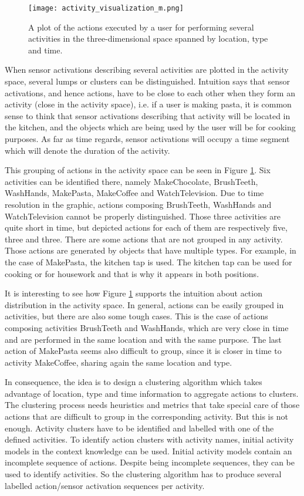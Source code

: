 \begin{figure}[htbp]
\centering
\texttt{[image: activity\_visualization\_m.png]}
    \caption{A plot of the actions executed by a user for performing several activities in the three-dimensional space spanned by location, type and time.}
    \label{fig-action-plot}
\end{figure}

When sensor activations describing several activities are plotted in the activity space, several lumps or clusters can be distinguished. Intuition says that sensor activations, and hence actions, have to be close to each other when they form an activity (close in the activity space), i.e. if a user is making pasta, it is common sense to think that sensor activations describing that activity will be located in the kitchen, and the objects which are being used by the user will be for cooking purposes. As far as time regards, sensor activations will occupy a time segment which will denote the duration of the activity.

This grouping of actions in the activity space can be seen in Figure \ref{fig-action-plot}. Six activities can be identified there, namely MakeChocolate, BrushTeeth, WashHands, MakePasta, MakeCoffee and WatchTelevision. Due to time resolution in the graphic, actions composing BrushTeeth, WashHands and WatchTelevision cannot be properly distinguished. Those three activities are quite short in time, but depicted actions for each of them are respectively five, three and three. There are some actions that are not grouped in any activity. Those actions are generated by objects that have multiple types. For example, in the case of MakePasta, the kitchen tap is used. The kitchen tap can be used for cooking or for housework and that is why it appears in both positions.

It is interesting to see how Figure \ref{fig-action-plot} supports the intuition about action distribution in the activity space. In general, actions can be easily grouped in activities, but there are also some tough cases. This is the case of actions composing activities BrushTeeth and WashHands, which are very close in time and are performed in the same location and with the same purpose. The last action of MakePasta seems also difficult to group, since it is closer in time to activity MakeCoffee, sharing again the same location and type. 

In consequence, the idea is to design a clustering algorithm which takes advantage of location, type and time information to aggregate actions to clusters. The clustering process needs heuristics and metrics that take special care of those actions that are difficult to group in the corresponding activity. But this is not enough. Activity clusters have to be identified and labelled with one of the defined activities. To identify action clusters with activity names, initial activity models in the context knowledge can be used. Initial activity models contain an incomplete sequence of actions. Despite being incomplete sequences, they can be used to identify activities. So the clustering algorithm has to produce several labelled action/sensor activation sequences per activity.

